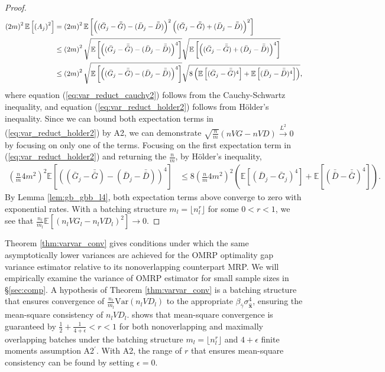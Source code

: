 \documentclass[12pt]{article}
\newcommand{\e}[1]{\mathbb{E} \left[ #1 \right]
}
\newcommand{\var}[1]{\mathrm{Var} \left( #1 \right)}
\newcommand{\x}{\mathbf{x}}
\newcommand{\xh}{{\hat{\x}}}
\newcommand{\gammab}{\bar{\gamma}}
\newcommand{\gb}{\bar{G}}
\newcommand{\gbb}{\bar{\gb}}
\newcommand{\db}{\bar{D}}
\newcommand{\dbb}{\bar{\db}}
\begin{document}
\begin{proof}
	\begin{align}
		\left( 2m \right)^2 \e{ \left( A_j \right)^2 } & = \left( 2m \right)^2 \e{ \left((\gb_j - \gbb) - (\db_j - \dbb)\right)^2 \left((\gb_j - \gbb) + (\db_j - \dbb)\right)^2 } \notag \\
		& \leq \left( 2m \right)^2 \sqrt{\e{\left((\gb_j - \gbb) - (\db_j - \dbb)\right)^4}} \sqrt{\e{\left((\gb_j - \gbb) + (\db_j - \dbb)\right)^4 }} \label{eq:var_reduct_cauchy2} \\
		& \leq \left( 2m \right)^2 \sqrt{\e{\left((\gb_j - \gbb) - (\db_j - \dbb)\right)^4}} \sqrt{8 \left(\e{(\gb_j - \gbb)^4} + \e{(\db_j - \dbb)^4} \right)}, \label{eq:var_reduct_holder2}
	\end{align}
	where equation (\ref{eq:var_reduct_cauchy2}) follows from the Cauchy-Schwartz inequality, and equation (\ref{eq:var_reduct_holder2}) follows from H\"{o}lder's inequality.  
        Since we can bound both expectation terms in (\ref{eq:var_reduct_holder2}) by A2, we can demonstrate $\sqrt{\frac{n}{m}}(nVG - nVD) \xrightarrow{L^2} 0$ by focusing on only one of the terms.  
        Focusing on the first expectation term in (\ref{eq:var_reduct_holder2}) and returning the $\tfrac{n}{m}$, by H\"{o}lder's inequality,
	\begin{align*}
		\left(\frac{n}{m} 4m^2\right)^2 \e{\left((\gb_j - \gbb) - (\db_j - \dbb)\right)^4}	& \leq 8 \left( \frac{n}{m} 4m^2\right)^2 \left( \e{(\db_j - \gb_j)^4} + \e{(\dbb - \gbb)^4} \right).
	\end{align*}	
	By Lemma \ref{lem:gb_gbb_l4}, both expectation terms above converge to zero with exponential rates.  
        With a batching structure $m_l = \lfloor n_l^r \rfloor$ for some $0<r<1$, we see that $\frac{n_l}{m_l} \e{(n_l VG_l - n_l VD_l)^2} \rightarrow 0$.
\end{proof} 


Theorem \ref{thm:varvar_conv} gives conditions under which the same asymptotically lower variances are achieved for the OMRP optimality gap variance estimator relative to its nonoverlapping counterpart MRP. 
We will empirically examine the variance of OMRP estimator for small sample sizes in \S \ref{sec:comp}. 
A hypothesis of Theorem \ref{thm:varvar_conv} is a batching structure that ensures convergence of $\frac{n_l}{m_l}\var{n_l VD_l}$ to the appropriate $\beta_{\gammab} \sigma^4_{\xh}$, ensuring the mean-square consistency of $n_l VD_l$. 
\citet{damerdji1995mean} shows that mean-square convergence is guaranteed by $\tfrac{1}{2} + \tfrac{1}{4+\epsilon} < r < 1$ for both nonoverlapping and maximally overlapping batches under the batching structure $m_l = \lfloor n_l^r \rfloor$ and $4+\epsilon$ finite moments assumption A2$^\prime$.  
With A2, the range of $r$ that ensures mean-square consistency can be found by setting $\epsilon=0$.
\end{document}
